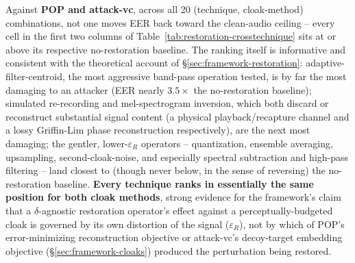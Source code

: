 \documentclass[11pt]{article}
\begin{document}
Against \textbf{POP and attack-vc}, across all 20 (technique,
cloak-method) combinations, not one moves EER back toward the
clean-audio ceiling -- every cell in the first two columns of
Table~\ref{tab:restoration-crosstechnique} sits at or above its
respective no-restoration baseline. The ranking itself is informative
and consistent with the theoretical account of
\S\ref{sec:framework-restoration}: adaptive-filter-centroid, the most
aggressive band-pass operation tested, is by far the most damaging to
an attacker (EER nearly $3.5\times$ the no-restoration baseline);
simulated re-recording and mel-spectrogram inversion, which both
discard or reconstruct substantial signal content (a physical
playback/recapture channel and a lossy Griffin-Lim phase
reconstruction respectively), are the next most damaging; the gentler,
lower-$\varepsilon_R$ operators -- quantization, ensemble averaging,
upsampling, second-cloak-noise, and especially spectral subtraction and
high-pass filtering -- land closest to (though never below, in the
sense of reversing) the no-restoration baseline. \textbf{Every
technique ranks in essentially the same position for both cloak
methods}, strong evidence for the framework's claim that a
$\delta$-agnostic restoration operator's effect against a
perceptually-budgeted cloak is governed by its own distortion of the
signal ($\varepsilon_R$), not by which of POP's error-minimizing
reconstruction objective or attack-vc's decoy-target embedding
objective (\S\ref{sec:framework-cloaks}) produced the perturbation
being restored.
\end{document}
